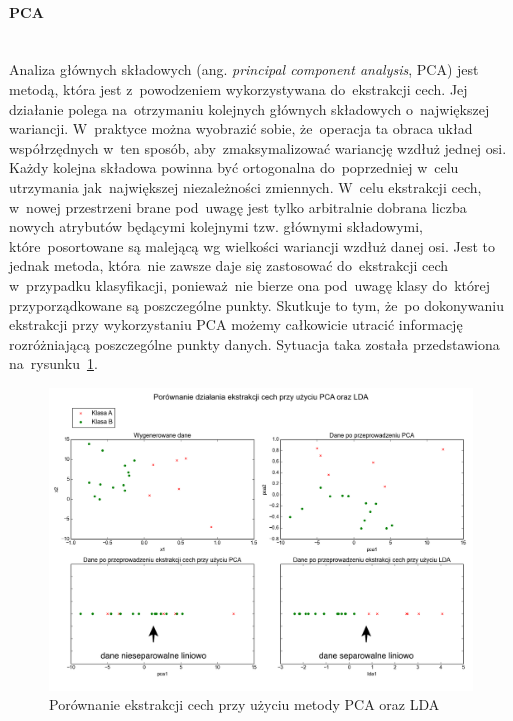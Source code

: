 \paragraph{PCA}\mbox{}\\
Analiza głównych składowych (ang. \textit{principal component analysis}, PCA)\cite{pcaReference} jest metodą, która jest z~powodzeniem wykorzystywana do~ekstrakcji cech. Jej działanie polega na~otrzymaniu kolejnych głównych składowych o~największej wariancji. W~praktyce można wyobrazić sobie, że~operacja ta obraca układ współrzędnych w~ten sposób, aby~zmaksymalizować wariancję wzdłuż jednej osi. Każdy kolejna składowa powinna być ortogonalna do~poprzedniej w~celu utrzymania jak~największej niezależności zmiennych. W~celu ekstrakcji cech, w~nowej przestrzeni brane pod~uwagę jest tylko arbitralnie dobrana liczba nowych atrybutów będącymi kolejnymi tzw. głównymi składowymi, które~posortowane są malejącą wg wielkości wariancji wzdłuż danej osi. Jest to jednak metoda, która~nie zawsze daje się zastosować do~ekstrakcji cech w~przypadku klasyfikacji, ponieważ~nie bierze ona pod~uwagę klasy do~której przyporządkowane są poszczególne punkty. Skutkuje to tym, że~po dokonywaniu ekstrakcji przy wykorzystaniu PCA możemy całkowicie utracić informację rozróżniającą poszczególne punkty danych. Sytuacja taka została przedstawiona na~rysunku~\ref{pcaIsShit}.


\begin{figure}[ht!]
\centering
\includegraphics[scale=0.5]{res/pcaldaDesc.png}
\caption[Caption for LOF]{Porównanie ekstrakcji cech przy użyciu metody PCA oraz LDA} \label{pcaIsShit} 
\end{figure}


